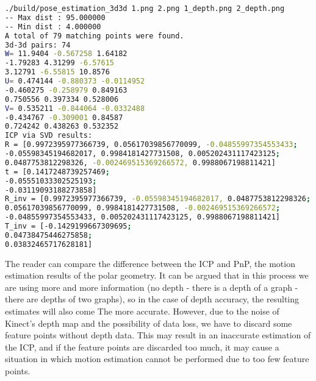 \begin{lstlisting}[language=sh,caption=terminal input:]
./build/pose_estimation_3d3d 1.png 2.png 1_depth.png 2_depth.png
-- Max dist : 95.000000
-- Min dist : 4.000000
A total of 79 matching points were found.
3d-3d pairs: 74
W= 11.9404 -0.567258 1.64182
-1.79283 4.31299 -6.57615
3.12791 -6.55815 10.8576
U= 0.474144 -0.880373 -0.0114952
-0.460275 -0.258979 0.849163
0.750556 0.397334 0.528006
V= 0.535211 -0.844064 -0.0332488
-0.434767 -0.309001 0.84587
0.724242 0.438263 0.532352
ICP via SVD results:
R = [0.9972395977366739, 0.05617039856770099, -0.04855997354553433;
-0.05598345194682017, 0.9984181427731508, 0.005202431117423125;
0.0487753812298326, -0.002469515369266572, 0.9988067198811421]
t = [0.1417248739257469;
-0.05551033302525193;
-0.03119093188273858]
R_inv = [0.9972395977366739, -0.05598345194682017, 0.0487753812298326;
0.05617039856770099, 0.9984181427731508, -0.002469515369266572;
-0.04855997354553433, 0.005202431117423125, 0.9988067198811421]
T_inv = [-0.1429199667309695;
0.04738475446275858;
0.03832465717628181]
\end{lstlisting}

The reader can compare the difference between the ICP and PnP, the motion estimation results of the polar geometry. It can be argued that in this process we are using more and more information (no depth - there is a depth of a graph - there are depths of two graphs), so in the case of depth accuracy, the resulting estimates will also come The more accurate. However, due to the noise of Kinect's depth map and the possibility of data loss, we have to discard some feature points without depth data. This may result in an inaccurate estimation of the ICP, and if the feature points are discarded too much, it may cause a situation in which motion estimation cannot be performed due to too few feature points.

